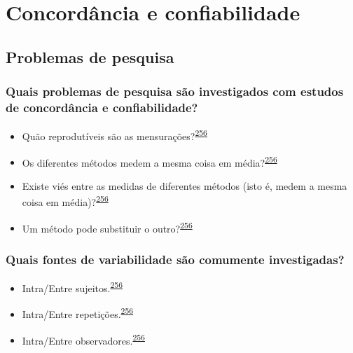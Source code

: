 \documentclass[
  a4paper,
]{book}
\begin{document}
\hypertarget{analise-concordancia-confiabilidade}{%
\chapter{\texorpdfstring{\textbf{Concordância e confiabilidade}}{Concordância e confiabilidade}}\label{analise-concordancia-confiabilidade}}

\hypertarget{problemas}{%
\section{Problemas de pesquisa}\label{problemas}}

\hypertarget{quais-problemas-de-pesquisa-suxe3o-investigados-com-estudos-de-concorduxe2ncia-e-confiabilidade}{%
\subsection{Quais problemas de pesquisa são investigados com estudos de concordância e confiabilidade?}\label{quais-problemas-de-pesquisa-suxe3o-investigados-com-estudos-de-concorduxe2ncia-e-confiabilidade}}

\begin{itemize}
\item
  Quão reprodutíveis são as mensurações?\textsuperscript{\protect\hyperlink{ref-altman1983}{256}}
\item
  Os diferentes métodos medem a mesma coisa em média?\textsuperscript{\protect\hyperlink{ref-altman1983}{256}}
\item
  Existe viés entre as medidas de diferentes métodos (isto é, medem a mesma coisa em média)?\textsuperscript{\protect\hyperlink{ref-altman1983}{256}}
\item
  Um método pode substituir o outro?\textsuperscript{\protect\hyperlink{ref-altman1983}{256}}
\end{itemize}

\hypertarget{quais-fontes-de-variabilidade-suxe3o-comumente-investigadas}{%
\subsection{Quais fontes de variabilidade são comumente investigadas?}\label{quais-fontes-de-variabilidade-suxe3o-comumente-investigadas}}

\begin{itemize}
\item
  Intra/Entre sujeitos.\textsuperscript{\protect\hyperlink{ref-altman1983}{256}}
\item
  Intra/Entre repetições.\textsuperscript{\protect\hyperlink{ref-altman1983}{256}}
\item
  Intra/Entre observadores.\textsuperscript{\protect\hyperlink{ref-altman1983}{256}}
\end{itemize}
\end{document}

